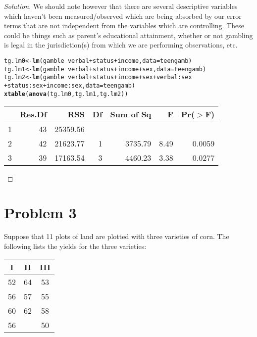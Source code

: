 \documentclass{amsart}\usepackage[]{graphicx}\usepackage[]{color}
\makeatletter
\newcommand{\hlopt}[1]{\textcolor[rgb]{0,0,0}{#1}}%
\newcommand{\hlstd}[1]{\textcolor[rgb]{0.345,0.345,0.345}{#1}}%
\newcommand{\hlkwb}[1]{\textcolor[rgb]{0.69,0.353,0.396}{#1}}%
\newcommand{\hlkwc}[1]{\textcolor[rgb]{0.333,0.667,0.333}{#1}}%
\newcommand{\hlkwd}[1]{\textcolor[rgb]{0.737,0.353,0.396}{\textbf{#1}}}%
\newenvironment{kframe}{%
 \def\at@end@of@kframe{}%
 \ifinner\ifhmode%
  \def\at@end@of@kframe{\end{minipage}}%
  \begin{minipage}{\columnwidth}%
 \fi\fi%
 \def\FrameCommand##1{\hskip\@totalleftmargin \hskip-\fboxsep
 \colorbox{shadecolor}{##1}\hskip-\fboxsep
     \hskip-\linewidth \hskip-\@totalleftmargin \hskip\columnwidth}%
 \MakeFramed {\advance\hsize-\width
   \@totalleftmargin\z@ \linewidth\hsize
   \@setminipage}}%
 {\par\unskip\endMakeFramed%
 \at@end@of@kframe}
\makeatother
\begin{document}
\begin{proof}[Solution]
		We should note however that there are several descriptive variables which haven't been measured/observed which are being absorbed by our error terms that are not independent from the variables which are controlling.
		These could be things such as parent's educational attainment, whether or not gambling is legal in the jurisdiction(s) from which we are performing observations, etc.
\begin{kframe}
\begin{alltt}
\hlstd{tg.lm0} \hlkwb{<-} \hlkwd{lm}\hlstd{(gamble}\hlopt{~}\hlstd{verbal}\hlopt{+}\hlstd{status}\hlopt{+}\hlstd{income,} \hlkwc{data} \hlstd{= teengamb)}
\hlstd{tg.lm1} \hlkwb{<-} \hlkwd{lm}\hlstd{(gamble}\hlopt{~}\hlstd{verbal}\hlopt{+}\hlstd{status}\hlopt{+}\hlstd{income}\hlopt{+}\hlstd{sex,} \hlkwc{data} \hlstd{= teengamb)}
\hlstd{tg.lm2} \hlkwb{<-} \hlkwd{lm}\hlstd{(gamble}\hlopt{~}\hlstd{verbal}\hlopt{+}\hlstd{status}\hlopt{+}\hlstd{income}\hlopt{+}\hlstd{sex}\hlopt{+}\hlstd{verbal}\hlopt{:}\hlstd{sex}
             \hlopt{+}\hlstd{status}\hlopt{:}\hlstd{sex}\hlopt{+}\hlstd{income}\hlopt{:}\hlstd{sex,} \hlkwc{data} \hlstd{= teengamb)}
\hlkwd{xtable}\hlstd{(}\hlkwd{anova}\hlstd{(tg.lm0, tg.lm1, tg.lm2))}
\end{alltt}
\end{kframe}%
\begin{table}[ht]
\centering
\begin{tabular}{lrrrrrr}
  \hline
 & Res.Df & RSS & Df & Sum of Sq & F & Pr($>$F) \\ 
  \hline
1 & 43 & 25359.56 &  &  &  &  \\ 
  2 & 42 & 21623.77 & 1 & 3735.79 & 8.49 & 0.0059 \\ 
  3 & 39 & 17163.54 & 3 & 4460.23 & 3.38 & 0.0277 \\ 
   \hline
\end{tabular}
\end{table}

		\end{proof}

	\section*{Problem 3} %
	\label{sec:problem_3}
		Suppose that 11 plots of land are plotted with three varieties of corn.
		The following lists the yields for the three varieties:

		\begin{tabular}{ccc}
			I & II & III \\
			\hline
			52 & 64 & 53 \\
			56 & 57 & 55 \\
			60 & 62 & 58 \\
			56 & & 50
		\end{tabular}
\end{document}
